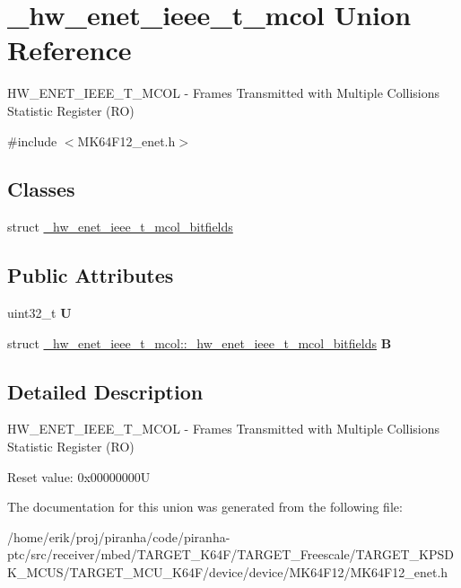 \hypertarget{union__hw__enet__ieee__t__mcol}{}\section{\+\_\+hw\+\_\+enet\+\_\+ieee\+\_\+t\+\_\+mcol Union Reference}
\label{union__hw__enet__ieee__t__mcol}


H\+W\+\_\+\+E\+N\+E\+T\+\_\+\+I\+E\+E\+E\+\_\+\+T\+\_\+\+M\+C\+OL -\/ Frames Transmitted with Multiple Collisions Statistic Register (RO)  




{\ttfamily \#include $<$M\+K64\+F12\+\_\+enet.\+h$>$}

\subsection*{Classes}
\begin{DoxyCompactItemize}
\item 
struct \hyperlink{struct__hw__enet__ieee__t__mcol_1_1__hw__enet__ieee__t__mcol__bitfields}{\+\_\+hw\+\_\+enet\+\_\+ieee\+\_\+t\+\_\+mcol\+\_\+bitfields}
\end{DoxyCompactItemize}
\subsection*{Public Attributes}
\begin{DoxyCompactItemize}
\item 
uint32\+\_\+t {\bfseries U}\hypertarget{union__hw__enet__ieee__t__mcol_a54dacd3b0a5640640f08637e87c5139b}{}\label{union__hw__enet__ieee__t__mcol_a54dacd3b0a5640640f08637e87c5139b}

\item 
struct \hyperlink{struct__hw__enet__ieee__t__mcol_1_1__hw__enet__ieee__t__mcol__bitfields}{\+\_\+hw\+\_\+enet\+\_\+ieee\+\_\+t\+\_\+mcol\+::\+\_\+hw\+\_\+enet\+\_\+ieee\+\_\+t\+\_\+mcol\+\_\+bitfields} {\bfseries B}\hypertarget{union__hw__enet__ieee__t__mcol_aa58ae835db08348c871a79a97bf89dbe}{}\label{union__hw__enet__ieee__t__mcol_aa58ae835db08348c871a79a97bf89dbe}

\end{DoxyCompactItemize}


\subsection{Detailed Description}
H\+W\+\_\+\+E\+N\+E\+T\+\_\+\+I\+E\+E\+E\+\_\+\+T\+\_\+\+M\+C\+OL -\/ Frames Transmitted with Multiple Collisions Statistic Register (RO) 

Reset value\+: 0x00000000U 

The documentation for this union was generated from the following file\+:\begin{DoxyCompactItemize}
\item 
/home/erik/proj/piranha/code/piranha-\/ptc/src/receiver/mbed/\+T\+A\+R\+G\+E\+T\+\_\+\+K64\+F/\+T\+A\+R\+G\+E\+T\+\_\+\+Freescale/\+T\+A\+R\+G\+E\+T\+\_\+\+K\+P\+S\+D\+K\+\_\+\+M\+C\+U\+S/\+T\+A\+R\+G\+E\+T\+\_\+\+M\+C\+U\+\_\+\+K64\+F/device/device/\+M\+K64\+F12/M\+K64\+F12\+\_\+enet.\+h\end{DoxyCompactItemize}
